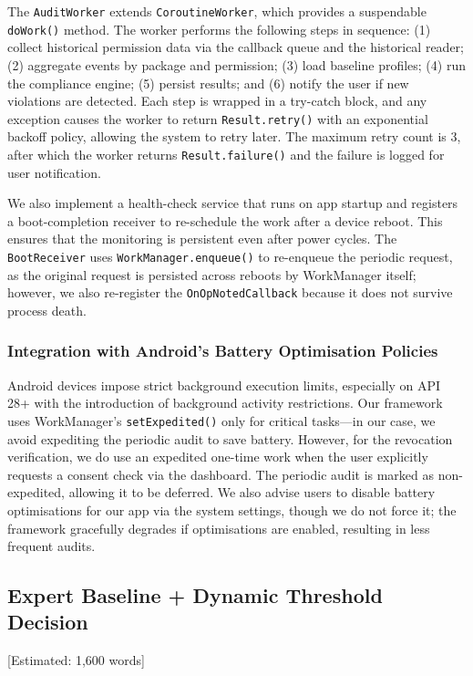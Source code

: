 The \texttt{AuditWorker} extends \texttt{CoroutineWorker}, which provides a suspendable \texttt{doWork()} method. The worker performs the following steps in sequence: (1) collect historical permission data via the callback queue and the historical reader; (2) aggregate events by package and permission; (3) load baseline profiles; (4) run the compliance engine; (5) persist results; and (6) notify the user if new violations are detected. Each step is wrapped in a try-catch block, and any exception causes the worker to return \texttt{Result.retry()} with an exponential backoff policy, allowing the system to retry later. The maximum retry count is 3, after which the worker returns \texttt{Result.failure()} and the failure is logged for user notification.

We also implement a health-check service that runs on app startup and registers a boot-completion receiver to re-schedule the work after a device reboot. This ensures that the monitoring is persistent even after power cycles. The \texttt{BootReceiver} uses \texttt{WorkManager.enqueue()} to re-enqueue the periodic request, as the original request is persisted across reboots by WorkManager itself; however, we also re-register the \texttt{OnOpNotedCallback} because it does not survive process death.

\subsubsection{Integration with Android's Battery Optimisation Policies}

Android devices impose strict background execution limits, especially on API 28+ with the introduction of background activity restrictions. Our framework uses WorkManager's \texttt{setExpedited()} only for critical tasks—in our case, we avoid expediting the periodic audit to save battery. However, for the revocation verification, we do use an expedited one-time work when the user explicitly requests a consent check via the dashboard. The periodic audit is marked as non-expedited, allowing it to be deferred. We also advise users to disable battery optimisations for our app via the system settings, though we do not force it; the framework gracefully degrades if optimisations are enabled, resulting in less frequent audits.

\subsection{Expert Baseline + Dynamic Threshold Decision} [Estimated: 1,600 words]

